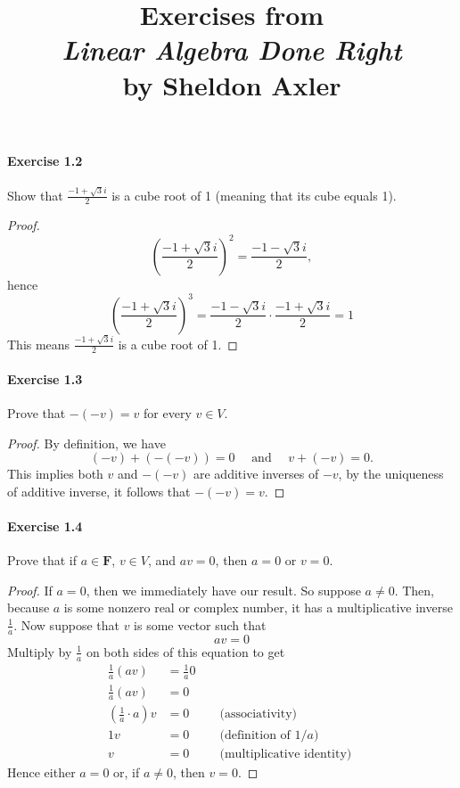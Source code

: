 \documentclass{article}
\title{\textbf{
Exercises from \\
\textit{Linear Algebra Done Right} \\
by Sheldon Axler
}}
\date{}
\theoremstyle{definition}
\begin{document}
\maketitle


\paragraph{Exercise 1.2} Show that $\frac{-1 + \sqrt{3}i}{2}$ is a cube root of 1 (meaning that its cube equals 1).
\begin{proof}
$$
\left(\frac{-1+\sqrt{3} i}{2}\right)^2=\frac{-1-\sqrt{3} i}{2},
$$
hence
$$
\left(\frac{-1+\sqrt{3} i}{2}\right)^3=\frac{-1-\sqrt{3} i}{2} \cdot \frac{-1+\sqrt{3} i}{2}=1
$$
This means $\frac{-1+\sqrt{3} i}{2}$ is a cube root of 1.
\end{proof}



\paragraph{Exercise 1.3} Prove that $-(-v) = v$ for every $v \in V$.
\begin{proof}
    By definition, we have
$$
(-v)+(-(-v))=0 \quad \text { and } \quad v+(-v)=0 .
$$
This implies both $v$ and $-(-v)$ are additive inverses of $-v$, by the uniqueness of additive inverse, it follows that $-(-v)=v$.
\end{proof}



\paragraph{Exercise 1.4} Prove that if $a \in \mathbf{F}$, $v \in V$, and $av = 0$, then $a = 0$ or $v = 0$.
\begin{proof}
    If $a=0$, then we immediately have our result. So suppose $a \neq 0$. Then, because $a$ is some nonzero real or complex number, it has a multiplicative inverse $\frac{1}{a}$. Now suppose that $v$ is some vector such that
$$
a v=0
$$
Multiply by $\frac{1}{a}$ on both sides of this equation to get
$$
\begin{aligned}
\frac{1}{a}(a v) & =\frac{1}{a} 0 & & \\
\frac{1}{a}(a v) & =0 & & \\
\left(\frac{1}{a} \cdot a\right) v & =0 & & \text { (associativity) } \\
1 v & =0 & & \text { (definition of } 1/a) \\
v & =0 & & \text { (multiplicative identity) }
\end{aligned}
$$
Hence either $a=0$ or, if $a \neq 0$, then $v=0$.
\end{proof}
\end{document}
